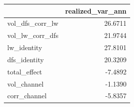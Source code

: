 \begin{tabular}{lr}
\toprule
 & realized_var_ann \\
\midrule
vol_dfs_corr_lw & 26.6711 \\
vol_lw_corr_dfs & 21.9744 \\
lw_identity & 27.8101 \\
dfs_identity & 20.3209 \\
total_effect & -7.4892 \\
vol_channel & -1.1390 \\
corr_channel & -5.8357 \\
\bottomrule
\end{tabular}
